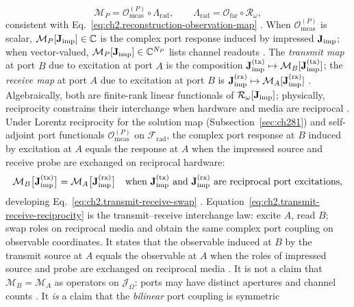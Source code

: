 \begin{equation}
\label{eq:ch2.port-radiation-reception-operator}
\mathcal{M}_P
=
\mathcal{O}_{\mathrm{meas}}^{(P)}\circ\Lambda_{\mathrm{rad}},
\qquad
\Lambda_{\mathrm{rad}}=\mathcal{O}_{\mathrm{far}}\circ\mathcal{R}_\omega,
\end{equation}
consistent with Eq.~\eqref{eq:ch2.reconstruction-observation-map}
\cite{stratton1941}. When \(\mathcal{O}_{\mathrm{meas}}^{(P)}\) is scalar,
\(\mathcal{M}_P[\mathbf{J}_{\mathrm{imp}}]\in\mathbb{C}\) is the complex port response induced by impressed
\(\mathbf{J}_{\mathrm{imp}}\); when vector-valued, \(\mathcal{M}_P[\mathbf{J}_{\mathrm{imp}}]\in\mathbb{C}^{N_P}\) lists channel
readouts \cite{stratton1941}. The \emph{transmit map} at port \(B\) due to excitation at
port \(A\) is the composition \(\mathbf{J}_{\mathrm{imp}}^{\mathrm{(tx)}}\mapsto
\mathcal{M}_B[\mathbf{J}_{\mathrm{imp}}^{\mathrm{(tx)}}]\); the \emph{receive map} at port \(A\) due to excitation
at port \(B\) is \(\mathbf{J}_{\mathrm{imp}}^{\mathrm{(rx)}}\mapsto\mathcal{M}_A[\mathbf{J}_{\mathrm{imp}}^{\mathrm{(rx)}}]\)
\cite{harrington2001}. Algebraically, both are finite-rank linear functionals of
\(\mathcal{R}_\omega[\mathbf{J}_{\mathrm{imp}}]\); physically, reciprocity constrains their interchange when
hardware and media are reciprocal \cite{stratton1941}.
Under Lorentz reciprocity for the solution map (Subsection~\ref{sec:ch281}) and self-adjoint port
functionals \(\mathcal{O}_{\mathrm{meas}}^{(P)}\) on \(\mathcal{F}_{\mathrm{rad}}\), the
complex port response at \(B\) induced by excitation at \(A\) equals the response at \(A\) when
the impressed source and receive probe are exchanged on reciprocal hardware:
\begin{equation}
\label{eq:ch2.transmit-receive-reciprocity}
\mathcal{M}_B\big[\Jimp^{\mathrm{(tx)}}\big]
=
\mathcal{M}_A\big[\Jimp^{\mathrm{(rx)}}\big]
\quad\text{when}\ 
\Jimp^{\mathrm{(tx)}}\ \text{and}\ \Jimp^{\mathrm{(rx)}}\ \text{are reciprocal port excitations},
\end{equation}
developing Eq.~\eqref{eq:ch2.transmit-receive-swap}
\cite{stratton1941}. Equation~\eqref{eq:ch2.transmit-receive-reciprocity}
is the transmit--receive interchange law: excite \(A\), read \(B\); swap roles on reciprocal
media and obtain the same complex port coupling on observable coordinates. It states that the
observable induced at \(B\) by the transmit source at \(A\) equals the observable at \(A\) when
the roles of impressed source and probe are exchanged on reciprocal media
\cite{stratton1941}. It is not a claim that \(\mathcal{M}_B=\mathcal{M}_A\) as
operators on \(\mathcal{J}_\Omega\): ports may have distinct apertures and channel counts
\cite{harrington2001}. It \emph{is} a claim that the \emph{bilinear} port coupling is symmetric
